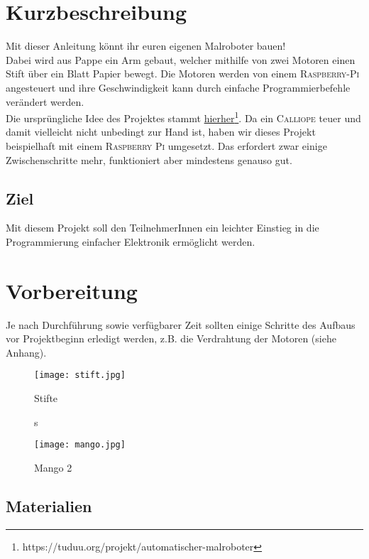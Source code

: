 \section{Kurzbeschreibung}
Mit dieser Anleitung könnt ihr euren eigenen Malroboter bauen!\\
Dabei wird aus Pappe ein Arm gebaut, welcher mithilfe von zwei Motoren einen Stift über ein Blatt Papier bewegt. Die Motoren werden von einem \textsc{Raspberry-Pi} angesteuert und ihre Geschwindigkeit kann durch einfache Programmierbefehle verändert werden.\\

Die ursprüngliche Idee des Projektes stammt \href{https://tuduu.org/projekt/automatischer-malroboter}{hierher}\footnote[1]{https://tuduu.org/projekt/automatischer-malroboter}. Da ein \textsc{Calliope} teuer und damit vielleicht nicht unbedingt zur Hand ist, haben wir dieses Projekt beispielhaft mit einem \textsc{Raspberry Pi} umgesetzt. Das erfordert zwar einige Zwischenschritte mehr, funktioniert aber mindestens genauso gut.\\

\subsection{Ziel}
Mit diesem Projekt soll den TeilnehmerInnen ein leichter Einstieg in die Programmierung einfacher Elektronik ermöglicht werden.\\



\section{Vorbereitung}
Je nach Durchführung sowie verfügbarer Zeit sollten einige Schritte des Aufbaus vor Projektbeginn erledigt werden, z.B. die Verdrahtung der Motoren (siehe Anhang).\\

\begin{figure}[h]
\centering
\parbox{5cm}{
\texttt{[image: stift.jpg]}
\caption*{Stifte}s
}
\hfill
\begin{minipage}{5cm}
\texttt{[image: mango.jpg]}
\caption*{Mango 2}
\end{minipage}
\end{figure}

\subsection{Materialien}

